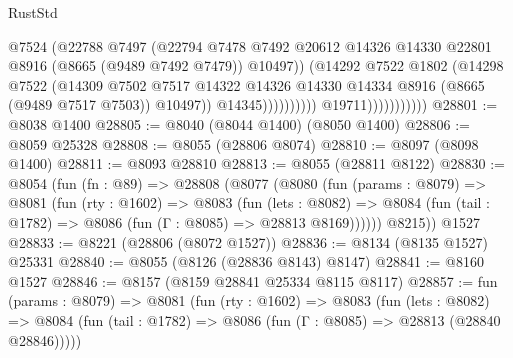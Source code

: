 \begin{lexlean}{RustStd}
\begin{coremodule}
                                            @7524
                                            (@22788
                                              @7497
                                              (@22794
                                                @7478
                                                @7492
                                                @20612
                                                @14326
                                                @14330
                                                @22801
                                                @8916
                                                (@8665 (@9489 @7492 @7479))
                                                @10497))
                                            (@14292
                                              @7522
                                              @1802
                                              (@14298
                                                @7522
                                                (@14309
                                                  @7502
                                                  @7517
                                                  @14322
                                                  @14326
                                                  @14330
                                                  @14334
                                                  @8916
                                                  (@8665 (@9489 @7517 @7503))
                                                  @10497))
                                              @14345))))))))))
                          @19711)))))))))))
@28801 := @8038 @1400
@28805 := @8040 (@8044 @1400) (@8050 @1400)
@28806 := @8059 @25328
@28808 := @8055 (@28806 @8074)
@28810 := @8097 (@8098 @1400)
@28811 := @8093 @28810
@28813 := @8055 (@28811 @8122)
@28830 := @8054
    (fun (fn : @89) =>
    @28808
      (@8077
        (@8080
          (fun (params : @8079) =>
          @8081
            (fun (rty : @1602) =>
            @8083
              (fun (lets : @8082) =>
              @8084 (fun (tail : @1782) => @8086 (fun (Γ : @8085) => @28813 @8169))))))
        @8215))
    @1527
@28833 := @8221 (@28806 (@8072 @1527))
@28836 := @8134 (@8135 @1527) @25331
@28840 := @8055 (@8126 (@28836 @8143) @8147)
@28841 := @8160 @1527
@28846 := @8157 (@8159 @28841 @25334 @8115 @8117)
@28857 := fun (params : @8079) =>
  @8081
    (fun (rty : @1602) =>
    @8083
      (fun (lets : @8082) =>
      @8084 (fun (tail : @1782) => @8086 (fun (Γ : @8085) => @28813 (@28840 @28846)))))

\end{coremodule}
\end{lexlean}
